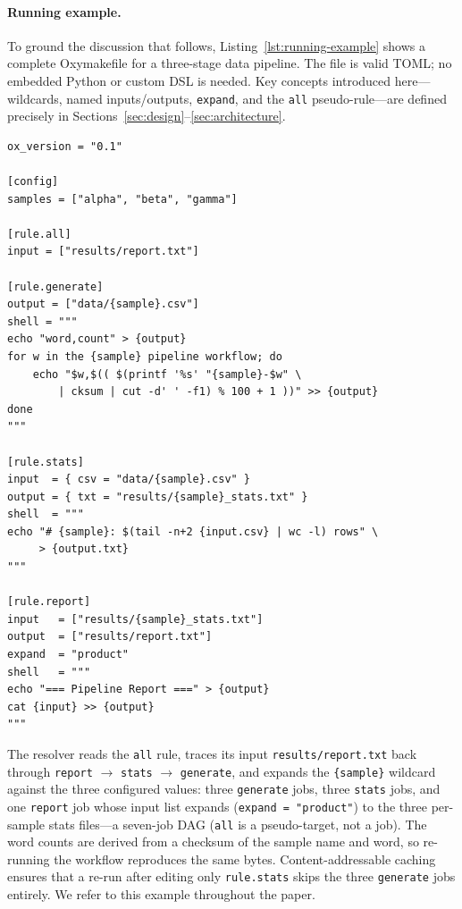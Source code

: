 \documentclass[12pt,a4paper]{article}
\newcommand{\code}[1]{{\texttt{\small\color{inlinecode}#1}}}
\begin{document}
\paragraph{Running example.}
To ground the discussion that follows, Listing~\ref{lst:running-example}
shows a complete Oxymakefile for a three-stage data pipeline.  The file is
valid TOML; no embedded Python or custom DSL is needed.  Key concepts
introduced here---wildcards, named inputs/outputs, \code{expand}, and the
\code{all} pseudo-rule---are defined precisely in
Sections~\ref{sec:design}--\ref{sec:architecture}.

\begin{lstlisting}[style=toml, caption={A complete Oxymakefile: generate
  per-sample data, compute statistics, and merge into a report.},
  label={lst:running-example}]
ox_version = "0.1"

[config]
samples = ["alpha", "beta", "gamma"]

[rule.all]
input = ["results/report.txt"]

[rule.generate]
output = ["data/{sample}.csv"]
shell = """
echo "word,count" > {output}
for w in the {sample} pipeline workflow; do
    echo "$w,$(( $(printf '%s' "{sample}-$w" \
        | cksum | cut -d' ' -f1) % 100 + 1 ))" >> {output}
done
"""

[rule.stats]
input  = { csv = "data/{sample}.csv" }
output = { txt = "results/{sample}_stats.txt" }
shell  = """
echo "# {sample}: $(tail -n+2 {input.csv} | wc -l) rows" \
     > {output.txt}
"""

[rule.report]
input   = ["results/{sample}_stats.txt"]
output  = ["results/report.txt"]
expand  = "product"
shell   = """
echo "=== Pipeline Report ===" > {output}
cat {input} >> {output}
"""
\end{lstlisting}

\noindent The resolver reads the \code{all} rule, traces its input
\code{results/report.txt} back through \code{report} $\to$ \code{stats}
$\to$ \code{generate}, and expands the \code{\{sample\}} wildcard against
the three configured values: three \code{generate} jobs, three
\code{stats} jobs, and one \code{report} job whose input list expands
(\code{expand = "product"}) to the three per-sample stats files---a
seven-job DAG (\code{all} is a pseudo-target, not a job). The word
counts are derived from a checksum of the sample name and word, so
re-running the workflow reproduces the same bytes. Content-addressable
caching ensures that a re-run after editing only \code{rule.stats} skips
the three \code{generate} jobs entirely.  We refer to this example
throughout the paper.
\end{document}
